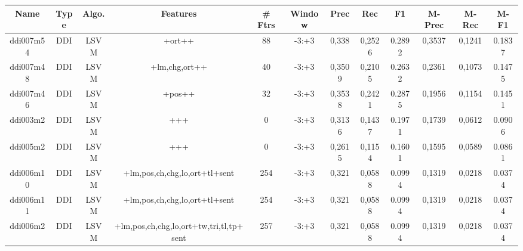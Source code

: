 \documentclass[a4paper]{article}
\begin{document}
\begin{landscape}
\begin{center}
\begin{tabular}{ |c|c|c|c|c|c|c|c|c|c|c|c|} 
 \hline
 	Name & Type & Algo. & Features & \# Ftrs & Window & Prec & Rec & F1 & M-Prec & M-Rec & M-F1\\
 \hline

 	

 
 	
 	\small{ ddi007m54 } & \small{ DDI} & \small{  LSVM }  & +ort++  &  88 &  \small{  -3:+3 }  &  0,338 & 0,2526 & 0.2892  &  0,3537 & 0,1241 & 0.1837 \\
 	

 
 	
 	\small{ ddi007m48 } & \small{ DDI} & \small{  LSVM }  & +lm,chg,ort++  &  40 &  \small{  -3:+3 }  &  0,3509 & 0,2105 & 0.2632  &  0,2361 & 0,1073 & 0.1475 \\
 	

 
 	
 	\small{ ddi007m46 } & \small{ DDI} & \small{  LSVM }  & +pos++  &  32 &  \small{  -3:+3 }  &  0,3538 & 0,2421 & 0.2875  &  0,1956 & 0,1154 & 0.1451 \\
 	

 
 	
 	\small{ ddi003m2 } & \small{ DDI} & \small{  LSVM }  & +++  &  0 &  \small{  -3:+3 }  &  0,3136 & 0,1437 & 0.1971  &  0,1739 & 0,0612 & 0.0906 \\
 	

 
 	
 	\small{ ddi005m2 } & \small{ DDI} & \small{  LSVM }  & +++  &  0 &  \small{  -3:+3 }  &  0,2615 & 0,1154 & 0.1601  &  0,1595 & 0,0589 & 0.0861 \\
 	

 
 	
 	\small{ ddi006m10 } & \small{ DDI} & \small{  LSVM }  & +lm,pos,ch,chg,lo,ort+tl+sent  &  254 &  \small{  -3:+3 }  &  0,321 & 0,0588 & 0.0994  &  0,1319 & 0,0218 & 0.0374 \\
 	

 
 	
 	\small{ ddi006m11 } & \small{ DDI} & \small{  LSVM }  & +lm,pos,ch,chg,lo,ort+tl+sent  &  254 &  \small{  -3:+3 }  &  0,321 & 0,0588 & 0.0994  &  0,1319 & 0,0218 & 0.0374 \\
 	

 
 	
 	\small{ ddi006m2 } & \small{ DDI} & \small{  LSVM }  & +lm,pos,ch,chg,lo,ort+tw,tri,tl,tp+sent  &  257 &  \small{  -3:+3 }  &  0,321 & 0,0588 & 0.0994  &  0,1319 & 0,0218 & 0.0374 \\
 	


\end{tabular}
\end{center}
\end{landscape}
\end{document}
